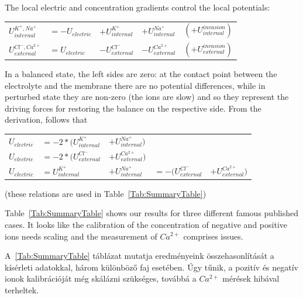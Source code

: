 {
The local electric and concentration gradients control the local potentials:

\begin{tabular}{lllll}
$U_{internal}^{K^+,Na^+}$  & $= -U_{electric}$ & $+ U_{internal}^{K^+} $ & $+ U_{internal}^{Na^+}$ & $(+U_{internal}^{invasion})$\\
$U_{external}^{Cl^-,Ca^{2+}} $&$= U_{electric} $&$- U_{external}^{Cl^-}$ &$- U_{external}^{Ca^{2+}}$&$(+U_{external}^{invasion})$
\end{tabular}

In a balanced state, the left sides are zero: at the contact point between the electrolyte and the membrane
there are no potential differences, while in perturbed state they are non-zero (the ions are slow) and so they represent the driving forces for restoring the balance on the respective side. 
From the derivation, follows that

\begin{tabular}{lllll}
	$U_{electric}$ &$= - 2*(U_{internal}^{K^+} $&$+ U_{internal}^{Na^+}) $\\
	$U_{electric}$ &$= - 2*(U_{external}^{Cl^-} $&$+ U_{external}^{Ca^{2+}})$ \\
	$U_{electric}$ &$=  U_{internal}^{K^+} $&$+ U_{internal}^{Na^+}$ 
	&$= - (U_{external}^{Cl^-} $&$+ U_{external}^{Ca^{2+}})$	
\end{tabular}
(these relations are used in Table~\ref{Tab:SummaryTable})
}

\fi

\ifx\magyar\undefined

Table~\ref{Tab:SummaryTable} shows our results for three different
famous published cases. It looks like the calibration of the concentration 
of negative and positive ions needs scaling and the measurement of $Ca^{2+}$
comprises issues.

\else
A~\ref{Tab:SummaryTable} táblázat mutatja eredményeink
összehasonlítását a kísérleti adatokkal, három különböző
faj esetében. Úgy tűnik, a pozitív és negatív ionok kalibrációját még skálázni szükséges, továbbá a 
 $Ca^{2+}$ mérések hibával terheltek.
\fi

\ifx\magyar\undefined

